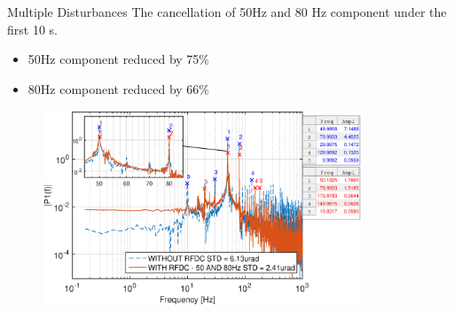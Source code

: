 \documentclass[10pt]{beamer}
\begin{document}
\begin{frame}{Multiple Disturbances}
  The cancellation of 50Hz and 80 Hz component under the first 10 s.
  \begin{itemize}
    \item 50Hz component reduced by 75\%
    \item  80Hz component reduced by 66\%
  \end{itemize}

  \begin{figure}[h]
    \centering %
    \includegraphics[width=0.85\textwidth]{../fig/matlab/mult_50_80_closed_loop}
  \end{figure}
\end{frame}
\end{document}
